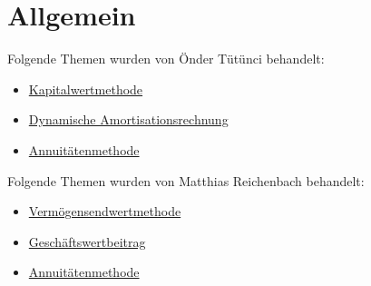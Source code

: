 \chapter{Allgemein}
\label{Einfuehrung}

\bigskip
\bigskip

Folgende Themen wurden von Önder Tütünci behandelt:

\begin{itemize}
    \item \hyperref[Kapitalwertmethode]{Kapitalwertmethode}
    \item \hyperref[Dynamische Amortisationsrechnung]{Dynamische Amortisationsrechnung}
    \item \hyperref[Annuitaetenmethode]{Annuitätenmethode}
\end{itemize}

\bigskip
\bigskip

\noindent
Folgende Themen wurden von Matthias Reichenbach behandelt:

\begin{itemize}
    \item \hyperref[Vermoegensendwertmethode]{Vermögensendwertmethode}
    \item \hyperref[Geschaeftswertbeitrag]{Geschäftswertbeitrag}
    \item \hyperref[Annuitaetenmethode]{Annuitätenmethode}
\end{itemize}
